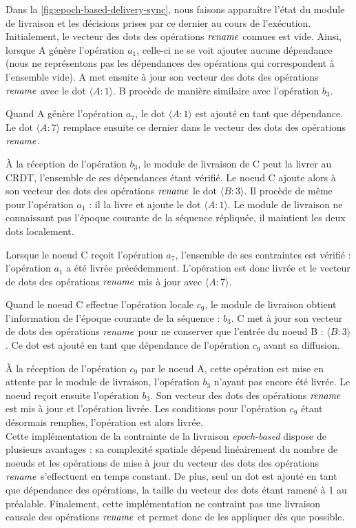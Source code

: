 Dans la \autoref{fig:epoch-based-delivery-sync}, nous faisons apparaître l'état du module de livraison et les décisions prises par ce dernier au cours de l'exécution.
Initialement, le vecteur des dots des opérations $\mathit{rename}$ connues est vide.
Ainsi, lorsque A génère l'opération $a_1$, celle-ci ne se voit ajouter aucune dépendance (nous ne représentons pas les dépendances des opérations qui correspondent à l'ensemble vide).
A met ensuite à jour son vecteur des dots des opérations $\mathit{rename}$ avec le dot $\langle A:1 \rangle$.
B procède de manière similaire avec l'opération $b_3$.

Quand A génère l'opération $a_7$, le dot $\langle A:1 \rangle$ est ajouté en tant que dépendance.
Le dot $\langle A:7 \rangle$ remplace ensuite ce dernier dans le vecteur des dots des opérations $\mathit{rename}$.

À la réception de l'opération $b_3$, le module de livraison de C peut la livrer au \ac{CRDT}, l'ensemble de ses dépendances étant vérifié.
Le noeud C ajoute alors à son vecteur des dots des opérations $\mathit{rename}$ le dot $\langle B:3 \rangle$.
Il procède de même pour l'opération $a_1$ : il la livre et ajoute le dot $\langle A:1 \rangle$.
Le module de livraison ne connaissant pas l'époque courante de la séquence répliquée, il maintient les deux dots localement.

Lorsque le noeud C reçoit l'opération $a_7$, l'ensemble de ses contraintes est vérifié : l'opération $a_1$ a été livrée précédemment.
L'opération est donc livrée et le vecteur de dots des opérations $\mathit{rename}$ mis à jour avec $\langle A:7 \rangle$.

Quand le noeud C effectue l'opération locale $c_9$, le module de livraison obtient l'information de l'époque courante de la séquence : $b_3$.
C met à jour son vecteur de dots des opérations $\mathit{rename}$ pour ne conserver que l'entrée du noeud B : $\langle B:3 \rangle$.
Ce dot est ajouté en tant que dépendance de l'opération $c_9$ avant sa diffusion.

À la réception de l'opération $c_9$ par le noeud A, cette opération est mise en attente par le module de livraison, l'opération $b_3$ n'ayant pas encore été livrée.
Le noeud reçoit ensuite l'opération $b_3$.
Son vecteur des dots des opérations $\mathit{rename}$ est mis à jour et l'opération livrée.
Les conditions pour l'opération $c_9$ étant désormais remplies, l'opération est alors livrée.\\

Cette implémentation de la contrainte de la livraison \emph{epoch-based} dispose de plusieurs avantages : sa complexité spatiale dépend linéairement du nombre de noeuds et les opérations de mise à jour du vecteur des dots des opérations $\mathit{rename}$ s'effectuent en temps constant.
De plus, seul un dot est ajouté en tant que dépendance des opérations, la taille du vecteur des dots étant ramené à 1 au préalable.
Finalement, cette implémentation ne contraint pas une livraison causale des opérations $\mathit{rename}$ et permet donc de les appliquer dès que possible.
